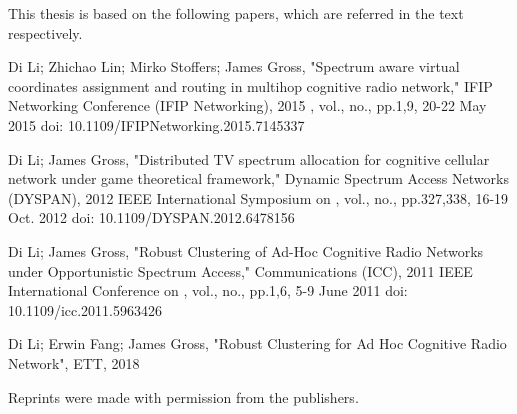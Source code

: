 This thesis is based on the following papers, which  are referred in the text respectively.

Di Li; Zhichao Lin; Mirko Stoffers; James Gross, "Spectrum aware virtual coordinates assignment and routing in multihop cognitive radio network," IFIP Networking Conference (IFIP Networking), 2015 , vol., no., pp.1,9, 20-22 May 2015
doi: 10.1109/IFIPNetworking.2015.7145337

Di Li; James Gross, "Distributed TV spectrum allocation for cognitive cellular network under game theoretical framework," Dynamic Spectrum Access Networks (DYSPAN), 2012 IEEE International Symposium on , vol., no., pp.327,338, 16-19 Oct. 2012
doi: 10.1109/DYSPAN.2012.6478156

Di Li; James Gross, "Robust Clustering of Ad-Hoc Cognitive Radio Networks under Opportunistic Spectrum Access," Communications (ICC), 2011 IEEE International Conference on , vol., no., pp.1,6, 5-9 June 2011
doi: 10.1109/icc.2011.5963426

Di Li; Erwin Fang; James Gross, "Robust Clustering for Ad Hoc Cognitive Radio Network", ETT, 2018


Reprints were made with permission from the publishers.